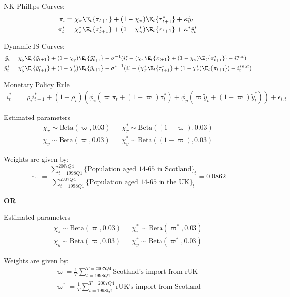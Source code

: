 NK Phillips Curves:
\begin{align*}
    \pi_t &= \chi_{\pi}\E_t\{ \pi_{t+1} \} + (1-\chi_{\pi})\E_t\{ \pi^*_{t+1} \} + \kappa \tilde{y}_t \\
    \pi^*_t &= \chi^*_{\pi}\E_t\{ \pi^*_{t+1} \} + (1-\chi^*_{\pi})\E_t\{ \pi_{t+1} \} + \kappa^* \tilde{y}^*_t
\end{align*}

Dynamic IS Curves:
\begin{align*}
    \tilde{y}_t &= \chi_{y}\E_t \{ \tilde{y}_{t+1} \} + (1-\chi_{y}) \E_t \{ \tilde{y}^*_{t+1} \} - {\sigma}^{-1}(i^*_t-(\chi_{\pi}\E_t\{ \pi_{t+1} \} + (1-\chi_{\pi})\E_t\{ \pi^*_{t+1} \}) - i_t^{nat}) \\
    \tilde{y}^*_t &= \chi^*_{y}\E_t \{ \tilde{y}^*_{t+1} \} + (1-\chi^*_{y}) \E_t \{ \tilde{y}_{t+1} \} - {\sigma^*}^{-1}(i^*_t-(\chi^*_{\pi}\E_t\{ \pi^*_{t+1} \} + (1-\chi^*_{\pi})\E_t\{ \pi_{t+1} \}) - i_t^{*nat})
\end{align*}

Monetary Policy Rule
\begin{align*}
    i^*_t &= \rho_i i^*_{t-1} + (1-\rho_i)(\phi_{\pi}(\varpi\pi_t + (1-\varpi)\pi^*_t) + \phi_{y}(\varpi \tilde{y}_t + (1-\varpi)\tilde{y}^*_t)) + \epsilon_{i,t}
\end{align*}

Estimated parameters
\begin{align*}
    \chi_{\pi} \sim \text{Beta}(\varpi, 0.03) && \chi^*_{\pi} \sim \text{Beta}((1-\varpi), 0.03)\\
    \chi_{y} \sim \text{Beta}(\varpi, 0.03) && \chi^*_{y} \sim \text{Beta}((1-\varpi), 0.03)
\end{align*}

Weights are given by:
\begin{equation*}
    \varpi = \frac{\sum_{t=1998Q1}^{2007Q4} \{\text{Population aged 14-65 in Scotland}\}_t}{\sum_{t=1998Q1}^{2007Q4} \{\text{Population aged 14-65 in the UK}\}_t} = 0.0862
\end{equation*}

\textbf{OR}

Estimated parameters
\begin{align*}
    \chi_{\pi} \sim \text{Beta}(\varpi, 0.03) && \chi^*_{\pi} \sim \text{Beta}(\varpi^*, 0.03)\\
    \chi_{y} \sim \text{Beta}(\varpi, 0.03) && \chi^*_{y} \sim \text{Beta}(\varpi^*, 0.03)
\end{align*}

Weights are given by:
\begin{align*}
    \varpi = \frac{1}{T}\sum\limits_{t=1998Q1}^{T=2007Q4}\text{Scotland's import from rUK} \\
    \varpi^* = \frac{1}{T}\sum\limits_{t=1998Q1}^{T=2007Q4}\text{rUK's import from Scotland}
\end{align*}

